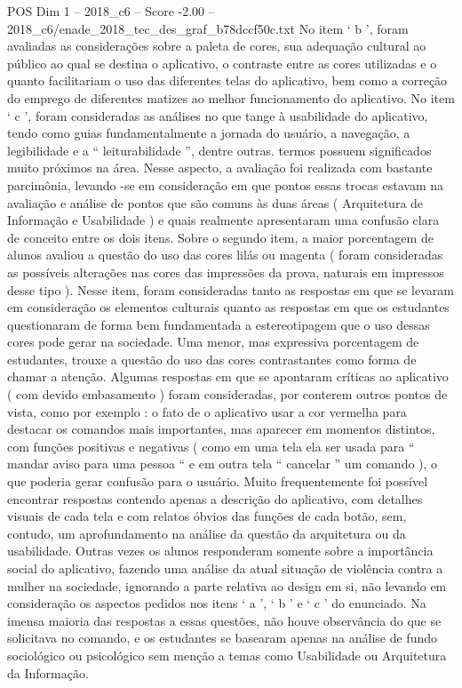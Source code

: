 \begin{textsample}{POS Dim 1 – 2018\_c6 – Score -2.00 – 2018\_c6/enade\_2018\_tec\_des\_graf\_b78dccf50c.txt}
No item ‘ b ’, foram avaliadas as considerações sobre a paleta de cores, sua adequação cultural ao público ao qual se destina o aplicativo, o contraste entre as cores utilizadas e o quanto facilitariam o uso das diferentes telas do aplicativo, bem como a correção do emprego de diferentes matizes ao melhor funcionamento do aplicativo.
No item ‘ c ’, foram consideradas as análises no que tange à usabilidade do aplicativo, tendo como guias fundamentalmente a jornada do usuário, a navegação, a legibilidade e a “ leiturabilidade ”, dentre outras. termos possuem significados muito próximos na área.
Nesse aspecto, a avaliação foi realizada com bastante parcimônia, levando -se em consideração em que pontos essas trocas estavam na avaliação e análise de pontos que são comuns às duas áreas ( Arquitetura de Informação e Usabilidade ) e quais realmente apresentaram uma confusão clara de conceito entre os dois itens.
Sobre o segundo item, a maior porcentagem de alunos avaliou a questão do uso das cores lilás ou magenta ( foram consideradas as possíveis alterações nas cores das impressões da prova, naturais em impressos desse tipo ).
Nesse item, foram consideradas tanto as respostas em que se levaram em consideração os elementos culturais quanto as respostas em que os estudantes questionaram de forma bem fundamentada a estereotipagem que o uso dessas cores pode gerar na sociedade.
Uma menor, mas expressiva porcentagem de estudantes, trouxe a questão do uso das cores contrastantes como forma de chamar a atenção.
Algumas respostas em que se apontaram críticas ao aplicativo ( com devido embasamento ) foram consideradas, por conterem outros pontos de vista, como por exemplo : o fato de o aplicativo usar a cor vermelha para destacar os comandos mais importantes, mas aparecer em momentos distintos, com funções positivas e negativas ( como em uma tela ela ser usada para “ mandar aviso para uma pessoa “ e em outra tela “ cancelar ” um comando ), o que poderia gerar confusão para o usuário.
Muito frequentemente foi possível encontrar respostas contendo apenas a descrição do aplicativo, com detalhes visuais de cada tela e com relatos óbvios das funções de cada botão, sem, contudo, um aprofundamento na análise da questão da arquitetura ou da usabilidade.
Outras vezes os alunos responderam somente sobre a importância social do aplicativo, fazendo uma análise da atual situação de violência contra a mulher na sociedade, ignorando a parte relativa ao design em si, não levando em consideração os aspectos pedidos nos itens ‘ a ’, ‘ b ’ e ‘ c ’ do enunciado.
Na imensa maioria das respostas a essas questões, não houve observância do que se solicitava no comando, e os estudantes se basearam apenas na análise de fundo sociológico ou psicológico sem menção a temas como Usabilidade ou Arquitetura da Informação.

\end{textsample}
